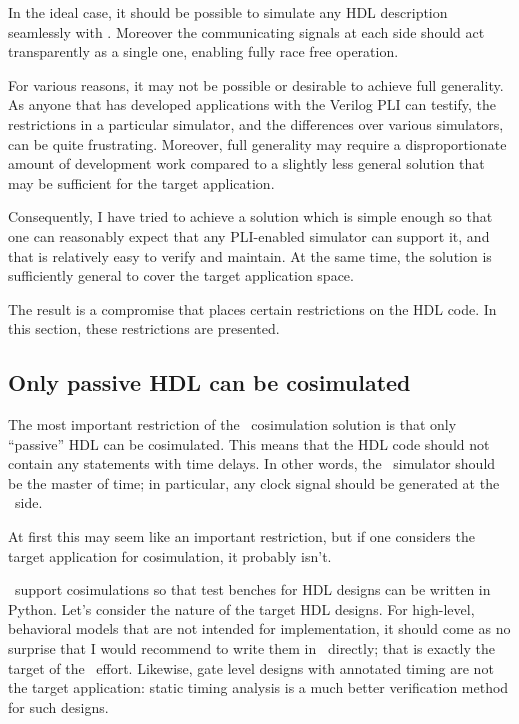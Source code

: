 In the ideal case, it should be possible to simulate
any HDL description seamlessly with \myhdl{}. Moreover
the communicating signals at each side should act
transparently as a single one, enabling fully race free
operation.

For various reasons, it may not be possible or desirable
to achieve full generality. As anyone that has developed
applications with the Verilog PLI can testify, the
restrictions in a particular simulator, and the 
differences over various simulators, can be quite 
frustrating. Moreover, full generality may require
a disproportionate amount of development work compared
to a slightly less general solution that may
be sufficient for the target application.

Consequently, I have tried to achieve a solution
which is simple enough so that one can reasonably 
expect that any PLI-enabled simulator can support it,
and that is relatively easy to verify and maintain.
At the same time, the solution is sufficiently general 
to cover the target application space.

The result is a compromise that places certain restrictions
on the HDL code. In this section, these restrictions 
are presented.

\subsection{Only passive HDL can be cosimulated}

The most important restriction of the \myhdl\ cosimulation solution is
that only ``passive'' HDL can be cosimulated.  This means that the HDL
code should not contain any statements with time delays. In other
words, the \myhdl\ simulator should be the master of time; in
particular, any clock signal should be generated at the \myhdl\ side.

At first this may seem like an important restriction, but if one
considers the target application for cosimulation, it probably
isn't. 

\myhdl\ support cosimulations so that test benches for HDL
designs can be written in Python.
Let's consider the nature of the target HDL designs. For high-level,
behavioral models that are not intended for implementation, it should
come as no surprise that I would recommend to write them in \myhdl\
directly; that is exactly the target of the \myhdl\ effort. Likewise,
gate level designs with annotated timing are not the target
application: static timing analysis is a much better verification
method for such designs.

